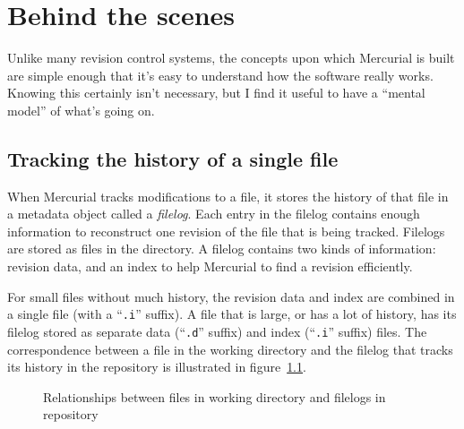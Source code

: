 \chapter{Behind the scenes}
\label{chap:concepts}

Unlike many revision control systems, the concepts upon which
Mercurial is built are simple enough that it's easy to understand how
the software really works.  Knowing this certainly isn't necessary,
but I find it useful to have a ``mental model'' of what's going on.

\section{Tracking the history of a single file}

When Mercurial tracks modifications to a file, it stores the history
of that file in a metadata object called a \emph{filelog}.  Each entry
in the filelog contains enough information to reconstruct one revision
of the file that is being tracked.  Filelogs are stored as files in
the  directory.  A filelog contains two kinds of
information: revision data, and an index to help Mercurial to find a
revision efficiently.  

For small files without much history, the revision data and index are
combined in a single file (with a ``\texttt{.i}'' suffix).  A file
that is large, or has a lot of history, has its filelog stored as
separate data (``\texttt{.d}'' suffix) and index (``\texttt{.i}''
suffix) files.  The correspondence between a file in the working
directory and the filelog that tracks its history in the repository is
illustrated in figure~\ref{fig:concepts:filelog}.

\begin{figure}[ht]
  \centering
  \caption{Relationships between files in working directory and
    filelogs in repository}
  \label{fig:concepts:filelog}
\end{figure}


